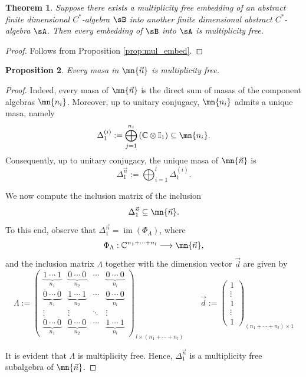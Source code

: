 \documentclass[12pt,a4paper]{amsart}
\theoremstyle{plain}
\newtheorem{theorem}{Theorem}[section]
\newtheorem{prop}[theorem]{Proposition}
\theoremstyle{definition}
\theoremstyle{remark}
\numberwithin{equation}{section}
\theoremstyle{ser}
\theoremstyle{serr}
\theoremstyle{ser}
\theoremstyle{ser}
\theoremstyle{collabquestion}
\newcommand{\C}{\mathbb{C}}
\newcommand{\<}{\langle}
\renewcommand{\>}{\rangle}
\begin{document}
\begin{theorem}
    Suppose there exists a multiplicity free embedding of an abstract finite dimensional $C^*$-algebra $\sB$ into another finite dimensional abstract $C^*$-algebra $\sA$. Then every embedding of $\sB$ into $\sA$ is multiplicity free.
\end{theorem}
\begin{proof}
    Follows from Proposition \ref{prop:mul_embed}.
\end{proof}

\begin{prop}\label{prop:masa_is_mult_free}
    Every masa in $\mn{\vec{n}}$ is multiplicity free.
\end{prop}
\begin{proof}
    Indeed, every masa of $\mn{\vec{n}}$ is the direct sum of masas of the component algebras $\mn{n_i}$. Moreover, up to unitary conjugacy, $\mn{n_i}$ admits a unique masa, namely
\[
\Delta_1^{(i)}:= \bigoplus_{j=1}^{n_i} \left( \C \otimes \mathbb{I}_1 \right) \subseteq \mn{n_i}.
\]
Consequently, up to unitary conjugacy, the unique masa of $\mn{\vec{n}}$ is
\[
\Delta_1^{\vec{n}}:=\bigoplus_{i=1}^l \Delta_1^{(i)}.
\]

We now compute the inclusion matrix of the inclusion
\[
\Delta_1^{\vec{n}} \subseteq \mn{\vec{n}}.
\]
To this end, observe that $\Delta_1^{\vec{n}}=\operatorname{im}(\Phi_\Lambda)$, where
\[
\Phi_\Lambda:\C^{n_1+\cdots+n_l}\longrightarrow \mn{\vec{n}},
\]
and the inclusion matrix $\Lambda$ together with the dimension vector $\vec{d}$ are given by
\[
\Lambda:=
\begin{pmatrix}
\underbrace{1\ \cdots\ 1}_{n_1} &
\underbrace{0\ \cdots\ 0}_{n_2} &
\cdots &
\underbrace{0\ \cdots\ 0}_{n_l}
\\
\underbrace{0\ \cdots\ 0}_{n_1} &
\underbrace{1\ \cdots\ 1}_{n_2} &
\cdots &
\underbrace{0\ \cdots\ 0}_{n_l}
\\
\vdots & \vdots & \ddots & \vdots
\\
\underbrace{0\ \cdots\ 0}_{n_1} &
\underbrace{0\ \cdots\ 0}_{n_2} &
\cdots &
\underbrace{1\ \cdots\ 1}_{n_l}
\end{pmatrix}_{\,l\times (n_1+\cdots+n_l)}
\qquad
\vec{d}:=
\begin{pmatrix}
1\\
\vdots\\
1\\
\vdots\\
1
\end{pmatrix}_{(n_1+\cdots+n_l)\times 1}
\]

It is evident that $\Lambda$ is multiplicity free. Hence, $\Delta_1^{\vec{n}}$ is a multiplicity free subalgebra of $\mn{\vec{n}}$.
\end{proof}
\end{document}
